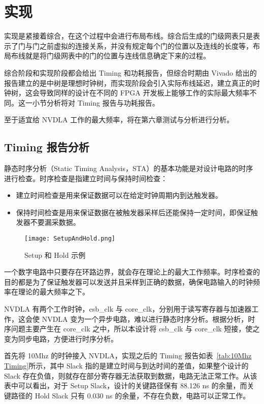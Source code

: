 \section{实现}

实现是紧接着综合，在这个过程中会进行布局布线。综合后生成的门级网表只是表示了门与门之前虚拟的连接关系，并没有规定每个门的位置以及连线的长度等，布局布线就是将门级网表中的门的位置与连线信息确定下来的过程。

综合阶段和实现阶段都会给出 Timing 和功耗报告，但综合时期由 Vivado 给出的报告建立的是中树是理想时钟树，而实现阶段会引入实际布线延迟，建立真正的时钟树，这会导致同样的设计在不同的 FPGA 开发板上能够工作的实际最大频率不同。这一小节分析将对 Timing 报告与功耗报告。

至于适宜给 NVDLA 工作的最大频率，将在第六章测试与分析进行分析。

\subsection{Timing 报告分析}

静态时序分析（Static Timing Analysis，STA）的基本功能是对设计电路的时序进行检查。时序检查是指建立时间与保持时间检查：
\begin{itemize}
    \item 建立时间检查是用来保证数据可以在给定时钟周期内到达触发器。
    \item 保持时间检查是用来保证数据在被触发器采样后还能保持一定时间，即保证触发器不要漏采数据。
\end{itemize}

\begin{figure}[!htbp]
    \centering
    \texttt{[image: SetupAndHold.png]}
    \caption{Setup 和 Hold 示例}
    \label{fig:Setup and Hold}
\end{figure}


一个数字电路中只要存在环路边界，就会存在理论上的最大工作频率。时序检查的目的都是为了保证触发器可以发送并且采样到正确的数据，确保电路输入的时钟频率在理论的最大频率之下。

NVDLA 有两个工作时钟，csb\_clk 与 core\_clk，分别用于读写寄存器与加速器工作，这会使 NVDLA 变为一个异步电路，难以进行静态时序分析。根据分析，时序问题主要产生在 core\_clk 之中，所以本设计将 csb\_clk 与 core\_clk 短接，使之变为同步电路，方便进行时序分析。

首先将 10Mhz 的时钟接入 NVDLA，实现之后的 Timing 报告如表~\ref{tab:10Mhz Timing}所示，其中 Slack 指的是建立时间与到达时间的差值，如果整个设计的 Slack 存在负值，则就存在部分寄存器无法获取到数据，电路无法正常工作。从该表中可以看出，对于 Setup Slack，设计的关键路径保有 88.126 ns 的余量，而关键路径的 Hold Slack 只有 0.030 ns 的余量，不存在负数，电路可以正常工作。


